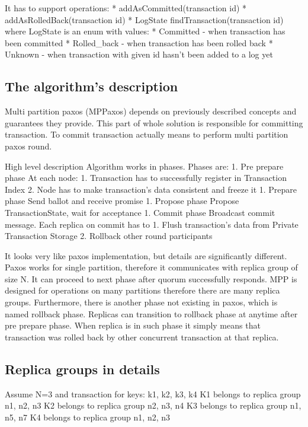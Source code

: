 It has to support operations:
* addAsCommitted(transaction id)
* addAsRolledBack(transaction id)
* LogState findTransaction(transaction id) where LogState is an enum with values: 
   * Committed - when transaction has been committed
   * Rolled_back - when transaction has been rolled back
   * Unknown - when transaction with given id hasn’t been added to a log yet


\subsection{The algorithm's description}
Multi partition paxos (MPPaxos) depends on previously described concepts and guarantees they provide. This part of whole solution is responsible for committing transaction. To commit transaction actually means to perform multi partition paxos round. 


        High level description
Algorithm works in phases. Phases are:
1. Pre prepare phase
At each node:
   1. Transaction has to successfully register in Transaction Index
   2. Node has to make transaction’s data consistent and freeze it
1. Prepare phase
Send ballot and receive promise
1. Propose phase
Propose TransactionState, wait for acceptance
1. Commit phase
        Broadcast commit message. Each replica on commit has to
   1. Flush transaction’s data from Private Transaction Storage
   2. Rollback other round participants
        
It looks very like paxos implementation, but details are significantly different. 
Paxos works for single partition, therefore it communicates with replica group of size N. It can proceed to next phase after quorum successfully responds. 
MPP is designed for operations on many partitions therefore there are many replica groups. 
Furthermore, there is another phase not existing in paxos, which is named rollback phase. Replicas can transition to rollback phase at anytime after pre prepare phase. When replica is in such phase it simply means that transaction was rolled back by other concurrent transaction at that replica. 


\subsection{Replica groups in details}
Assume N=3 and transaction for keys: k1, k2, k3, k4 
K1 belongs to replica group n1, n2, n3
K2 belongs to replica group n2, n3, n4
K3 belongs to replica group n1, n5, n7
K4 belongs to replica group n1, n2, n3


